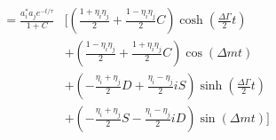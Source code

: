 \documentclass[a4paper,9pt,twoside]{article}
\begin{document}
\begin{eqnarray}
                                &= \frac{ a_i^* a_j e^{-t/\tau}} {1+C}&\Biggl[ \left( \frac{1+\eta_i\eta_j}{2} +  \frac{1-\eta_i\eta_j}{2}C\right) \cosh\left(\frac{\Delta\Gamma}{2}t\right) \\
                                                                          &&  +\left( \frac{1-\eta_i\eta_j}{2} +  \frac{1+\eta_i\eta_j}{2}C\right) \cos(\Delta m t) \\
                                                                          &&  +\left(-\frac{\eta_i+\eta_j}{2}D + \frac{\eta_i-\eta_j}{2}iS\right) \sinh\left(\frac{\Delta\Gamma}{2}t\right) \\
                                                                          &&  +\left(-\frac{\eta_i+\eta_j}{2}S - \frac{\eta_i-\eta_j}{2}iD\right) \sin(\Delta m t) \Biggr] 
\end{eqnarray}
\end{document}
